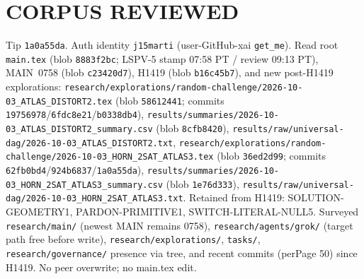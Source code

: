 \documentclass[11pt]{article}
\begin{document}
\section*{CORPUS REVIEWED}
Tip \texttt{1a0a55da}. Auth identity \texttt{j15marti}
(user-GitHub-xai \texttt{get\_me}).
Read root \texttt{main.tex} (blob \texttt{8883f2bc}; LSPV-5 stamp 07:58 PT / review 09:13 PT),
MAIN~0758 (blob \texttt{c23420d7}),
H1419 (blob \texttt{b16c45b7}),
and new post-H1419 explorations:
\texttt{research/explorations/random-challenge/2026-10-03\_ATLAS\_DISTORT2.tex}
(blob \texttt{58612441}; commits \texttt{19756978}/\texttt{6fdc8e21}/\texttt{b0338db4}),
\texttt{results/summaries/2026-10-03\_ATLAS\_DISTORT2\_summary.csv}
(blob \texttt{8cfb8420}),
\texttt{results/raw/universal-dag/2026-10-03\_ATLAS\_DISTORT2.txt},
\texttt{research/explorations/random-challenge/2026-10-03\_HORN\_2SAT\_ATLAS3.tex}
(blob \texttt{36ed2d99}; commits \texttt{62fb0bd4}/\texttt{924b6837}/\texttt{1a0a55da}),
\texttt{results/summaries/2026-10-03\_HORN\_2SAT\_ATLAS3\_summary.csv}
(blob \texttt{1e76d333}),
\texttt{results/raw/universal-dag/2026-10-03\_HORN\_2SAT\_ATLAS3.txt}.
Retained from H1419: SOLUTION-GEOMETRY1, PARDON-PRIMITIVE1, SWITCH-LITERAL-NULL5.
Surveyed \texttt{research/main/} (newest MAIN remains 0758),
\texttt{research/agents/grok/} (target path free before write),
\texttt{research/explorations/}, \texttt{tasks/}, \texttt{research/governance/} presence via tree,
and recent commits (perPage 50) since H1419.
No peer overwrite; no main.tex edit.
\end{document}
